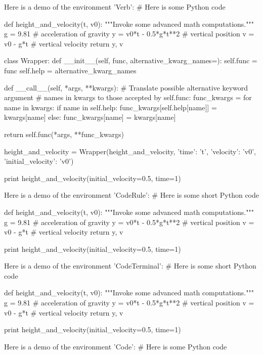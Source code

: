 
\noindent
Here is a demo of the environment 'Verb':
# Here is some Python code

def height_and_velocity(t, v0):
    """Invoke some advanced math computations."""
    g = 9.81                  # acceleration of gravity
    y = v0*t - 0.5*g*t**2     # vertical position
    v = v0 - g*t              # vertical velocity
    return y, v

class Wrapper:
    def __init__(self, func, alternative_kwarg_names={}):
        self.func = func
        self.help = alternative_kwarg_names

    def __call__(self, *args, **kwargs):
        # Translate possible alternative keyword argument
        # names in kwargs to those accepted by self.func:
        func_kwargs = {}
        for name in kwargs:
            if name in self.help:
                func_kwargs[self.help[name]] = kwargs[name]
            else:
                func_kwargs[name] = kwargs[name]

        return self.func(*args, **func_kwargs)

height_and_velocity = Wrapper(height_and_velocity,
                              {'time': 't',
                               'velocity': 'v0',
                               'initial_velocity': 'v0'})

print height_and_velocity(initial_velocity=0.5, time=1)


\noindent
Here is a demo of the environment 'CodeRule':
# Here is some short Python code

def height_and_velocity(t, v0):
    """Invoke some advanced math computations."""
    g = 9.81                  # acceleration of gravity
    y = v0*t - 0.5*g*t**2     # vertical position
    v = v0 - g*t              # vertical velocity
    return y, v

print height_and_velocity(initial_velocity=0.5, time=1)


\noindent
Here is a demo of the environment 'CodeTerminal':
# Here is some short Python code

def height_and_velocity(t, v0):
    """Invoke some advanced math computations."""
    g = 9.81                  # acceleration of gravity
    y = v0*t - 0.5*g*t**2     # vertical position
    v = v0 - g*t              # vertical velocity
    return y, v

print height_and_velocity(initial_velocity=0.5, time=1)


\noindent
Here is a demo of the environment 'Code':
# Here is some Python code

